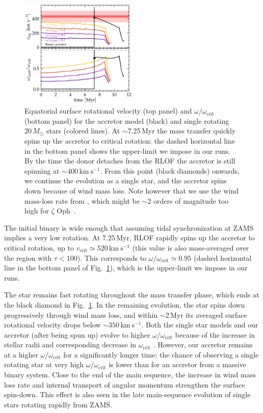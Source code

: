 \documentclass[twocolumn,twocolappendix,trackchanges]{aastex63}
\newcommand{\kms}{{\mathrm{km\ s^{-1}}}}
\DeclareRobustCommand{\Figref}[1]{Fig.~\ref{#1}}
\newcommand{\zoph}{$\zeta$ Oph}
\begin{document}
\begin{figure}[tbp]
  \includegraphics[width=0.5\textwidth]{zeta_rot}
  \caption{Equatorial surface rotational velocity (top panel) and
    $\omega/\omega_\mathrm{crit}$ (bottom panel) for the accretor model (black) and single rotating
    $20\,M_\odot$ stars (colored lines). At
    $\sim$7.25\,Myr the mass transfer quickly spins up the accretor to critical rotation: the dashed horizontal line in the bottom panel shows the upper-limit we impose in our runs. By the time the donor detaches from the RLOF the accretor is still spinning at
    $\sim$$400\,\kms$. From this point (black diamonds) onwards, we
    continue the evolution as a single star, and the accretor spins
    down because of wind mass loss.  Note however that we use the wind
    mass-loss rate from \cite{vink:01}, which might be $\sim$2 orders
    of magnitude too high for \zoph\ \citep{marcolino:09}.}
  \label{fig:surf_rot}
\end{figure}



The initial binary is wide enough that assuming tidal synchronization
at ZAMS implies a very low rotation. At 7.25\,Myr, RLOF rapidly spins
up the accretor to critical rotation, up to
$v_\mathrm{crit}\simeq520\,\kms$ (this value is also mass-averaged
over the region with $\tau<100$). This corresponds to
$\omega/\omega_\mathrm{crit}\simeq 0.95$ (dashed horizontal line in
the bottom panel of \Figref{fig:surf_rot}), which is the upper-limit
we impose in our runs.

The star remains fast rotating throughout the mass transfer phase,
which ends at the black diamond in \Figref{fig:surf_rot}. In the
remaining evolution, the star spins down progressively through wind
mass loss, and within $\sim$2\,Myr its averaged surface rotational
velocity drops below
$\sim$$350\,\kms$. Both the single star models and our accretor (after being spun up) evolve to higher
$\omega/\omega_\mathrm{crit}$ because of the increase in stellar radii and corresponding decrease in
$\omega_\mathrm{crit}$ \citep[e.g.,][]{langer:98, zhao:20}. However, our accretor remains at a higher
$\omega/\omega_\mathrm{crit}$ for a significantly longer time: the chance of observing a single rotating star at very high
$\omega/\omega_\mathrm{crit}$ is lower than for an accretor from a massive binary system. Close to the end of the main sequence, the increase in wind mass loss rate and internal transport of angular momentum strengthen the surface spin-down. This effect is also seen in the late main-sequence evolution of single stars rotating rapidly from ZAMS.
\end{document}
